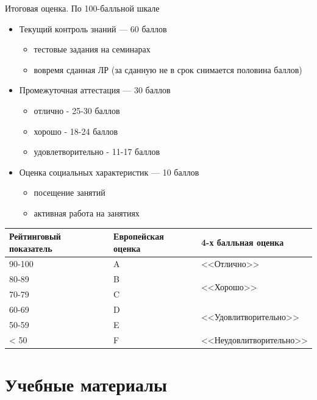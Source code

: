 \documentclass{beamer}
\begin{document}
\begin{frame}{Итоговая оценка. По 100-балльной шкале}
    \begin{itemize}
        \item Текущий контроль знаний --- 60 баллов
        \begin{itemize}
            \item тестовые задания на семинарах
            \item вовремя сданная ЛР (за сданную не в срок снимается половина баллов)
        \end{itemize}
        \item Промежуточная аттестация --- 30 баллов
        \begin{itemize}
            \item отлично - 25-30 баллов
            \item хорошо - 18-24 баллов
            \item удовлетворительно - 11-17 баллов
        \end{itemize}
        \item Оценка социальных характеристик --- 10 баллов
        \begin{itemize}
            \item посещение занятий
            \item активная работа на занятиях
        \end{itemize}
    \end{itemize}
    \small
    \begin{tabular}{|p{}|p{}|p{}|}
    \hline
    Рейтинговый показатель & Европейская оценка & 4-х балльная оценка \\
    \hline
    90-100 & A & <<Отлично>>\\
    \hline
    80-89 & B & \multirow{2}{*}{<<Хорошо>>}\\
    70-79 & C & \\
    \hline
    60-69 & D & \multirow{2}{*}{<<Удовлитворительно>>}\\
    50-59 & E & \\
    \hline
    < 50 & F & <<Неудовлитворительно>>\\
    \hline
    \end{tabular}
\end{frame}
\section{Учебные материалы}
\end{document}
